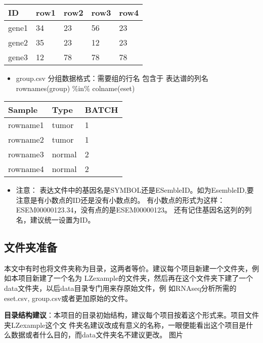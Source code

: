 \documentclass[
]{book}
\providecommand{\tightlist}{%
  \setlength{\itemsep}{0pt}\setlength{\parskip}{0pt}}
\begin{document}
\begin{longtable}[]{@{}lllll@{}}
\toprule\noalign{}
ID & row1 & row2 & row3 & row4 \\
\midrule\noalign{}
\endhead
\bottomrule\noalign{}
\endlastfoot
gene1 & 34 & 23 & 56 & 23 \\
gene2 & 35 & 23 & 12 & 23 \\
gene3 & 12 & 78 & 78 & 78 \\
\end{longtable}

\begin{itemize}
\tightlist
\item
  group.csv 分组数据格式：需要组的行名 包含于 表达谱的列名 rownames(group) \%in\% colname(eset)
\end{itemize}

\begin{longtable}[]{@{}lll@{}}
\toprule\noalign{}
Sample & Type & BATCH \\
\midrule\noalign{}
\endhead
\bottomrule\noalign{}
\endlastfoot
rowname1 & tumor & 1 \\
rowname2 & tumor & 1 \\
rowname3 & normal & 2 \\
rowname4 & normal & 2 \\
\end{longtable}

\begin{itemize}
\tightlist
\item
  注意：
  表达文件中的基因名是SYMBOL还是ESembleID。如为EsembleID,要注意是有小数点的ID还是没有小数点的。
  有小数点的形式为这样：ESEM00000123.34，没有点的是ESEM00000123。
  还有记住基因名这列的列名，建议统一设置为ID。
\end{itemize}

\hypertarget{ux6587ux4ef6ux5939ux51c6ux5907}{%
\subsection{文件夹准备}\label{ux6587ux4ef6ux5939ux51c6ux5907}}

本文中有时也将文件夹称为目录，这两者等价。建议每个项目新建一个文件夹，例如本项目新建了一个名为
LZexample的文件夹，然后再在这个文件夹下建了一个data文件夹，以后data目录专门用来存原始文件，例
如RNAseq分析所需的eset.csv, group.csv或者更加原始的文件。

\textbf{目录结构建议}：本项目的目录初始结构，建议每个项目按着这个形式来。项目文件夹LZexample这个文
件夹名建议改成有意义的名称，一眼便能看出这个项目是什么数据或者什么目的，而data文件夹名不建议更改。
图片
\end{document}
